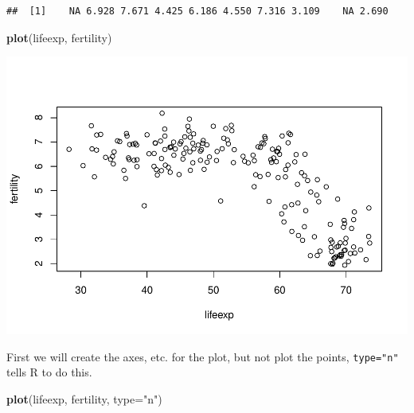 \documentclass[]{article}
\newenvironment{Shaded}{\begin{snugshade}}{\end{snugshade}}
\newcommand{\KeywordTok}[1]{\textcolor[rgb]{0.13,0.29,0.53}{\textbf{#1}}}
\newcommand{\DataTypeTok}[1]{\textcolor[rgb]{0.13,0.29,0.53}{#1}}
\newcommand{\DecValTok}[1]{\textcolor[rgb]{0.00,0.00,0.81}{#1}}
\newcommand{\StringTok}[1]{\textcolor[rgb]{0.31,0.60,0.02}{#1}}
\newcommand{\OperatorTok}[1]{\textcolor[rgb]{0.81,0.36,0.00}{\textbf{#1}}}
\newcommand{\NormalTok}[1]{#1}
\begin{document}
\begin{verbatim}
##  [1]    NA 6.928 7.671 4.425 6.186 4.550 7.316 3.109    NA 2.690
\end{verbatim}

\begin{Shaded}
\begin{Highlighting}[]
\KeywordTok{plot}\NormalTok{(lifeexp, fertility)}
\end{Highlighting}
\end{Shaded}

\includegraphics{stt-301-programming_files/figure-latex/unnamed-chunk-2-1.pdf}

\begin{Shaded}
\end{Shaded}

First we will create the axes, etc. for the plot, but not plot the
points, \texttt{type="n"} tells R to do this.

\begin{Shaded}
\begin{Highlighting}[]
\KeywordTok{plot}\NormalTok{(lifeexp, fertility, }\DataTypeTok{type=}\StringTok{"n"}\NormalTok{)}
\end{Highlighting}
\end{Shaded}
\end{document}

